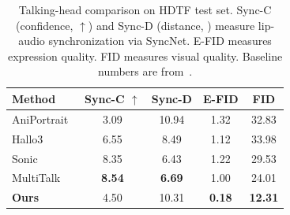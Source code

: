 \begin{table}[t]
\centering
\caption{Talking-head comparison on HDTF test set. Sync-C (confidence, $\uparrow$) and Sync-D (distance, ) measure lip-audio synchronization via SyncNet. E-FID measures expression quality. FID measures visual quality.
Baseline numbers are from~\cite{kong2025multitalk}.}
\label{tab:whoistalking}
\setlength{\tabcolsep}{5pt}
\begin{tabular}{lcccc}
\toprule
Method & Sync-C $\uparrow$ & Sync-D  & E-FID  & FID  \\
\midrule
AniPortrait~\cite{wei2024aniportrait} & 3.09 & 10.94 & 1.32 & 32.83 \\
Hallo3~\cite{cui2025hallo3} & 6.55 & 8.49 & 1.12 & 33.98 \\
Sonic~\cite{ji2025sonic} & 8.35 & 6.43 & 1.22 & 29.53 \\
MultiTalk~\cite{kong2025multitalk} & \textbf{8.54} & \textbf{6.69} & 1.00 & 24.01 \\
\midrule
\textbf{Ours} & 4.50 & 10.31 & \textbf{0.18} & \textbf{12.31} \\
\bottomrule
\end{tabular}
\end{table}
